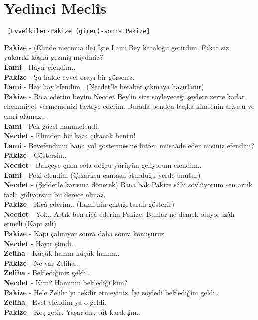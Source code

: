 \documentclass[]{book}
\begin{document}
\hypertarget{yedinci-meclis}{%
\section{Yedinci Meclîs}\label{yedinci-meclis}}

\begin{verbatim}
 [Evvelkiler-Pakize (girer)-sonra Pakize]
\end{verbatim}

\textbf{Pakize} - (Elinde mecmua ile) İşte Lami Bey kataloğu getirdim. Fakat siz yukarıki köşkü gezmiş miydiniz?\\
\textbf{Lami} - Hayır efendim..\\
\textbf{Pakize} - Şu halde evvel orayı bir görseniz.\\
\textbf{Lami} - Hay hay efendim.. (Necdet'le beraber çıkmaya hazırlanır)\\
\textbf{Pakize} - Rica ederim beyim Necdet Bey'in size söyleyeceği şeylere zerre kadar ehemmiyet vermemenizi tavsiye ederim. Burada benden başka kimsenin arzusu ve emri olamaz..\\
\textbf{Lami} - Pek güzel hanımefendi.\\
\textbf{Necdet} - Elimden bir kaza çıkacak benim!\\
\textbf{Lami} - Beyefendinin bana yol göstermesine lütfen müsaade eder misiniz efendim?\\
\textbf{Pakize} - Göstersin..\\
\textbf{Necdet} - Bahçeye çıkın sola doğru yürüyün geliyorum efendim..\\
\textbf{Lami} - Peki efendim (Çıkarken çantasıı oturduğu yerde unutur)\\
\textbf{Necdet} - (Şiddetle karısına dönerek) Bana bak Pakize sâhî söylüyorum sen artık fazla gidiyorsun bu derece olmaz.\\
\textbf{Pakize} - Ricâ ederim.. (Lami'nin çıktığı tarafı gösterir)\\
\textbf{Necdet} - Yok.. Artık ben ricâ ederim Pakize. Bunlar ne demek oluyor izâh etmeli (Kapı zili)\\
\textbf{Pakize} - Kapı çalınıyor sonra daha sonra konuşuruz\\
\textbf{Necdet} - Hayır şimdi..\\
\textbf{Zeliha} - Küçük hanım küçük hanım..\\
\textbf{Pakize} - Ne var Zeliha..\\
\textbf{Zeliha} - Beklediğiniz geldi..\\
\textbf{Necdet} - Kim? Hanımın beklediği kim?\\
\textbf{Pakize} - Hele Zeliha'yı tekdîr etmeyiniz. İyi söyledi beklediğim geldi..\\
\textbf{Zeliha} - Evet efendim ya o geldi.\\
\textbf{Pakize} - Koş getir. Yaşar'dır, süt kardeşim..\\
\end{document}
